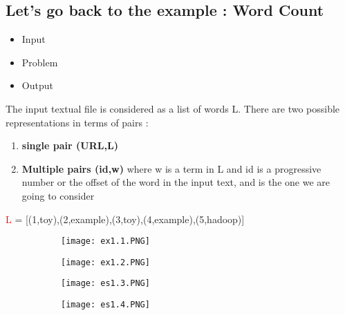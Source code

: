 \documentclass{article}
\begin{document}
\subsection{Let's go back to the example : Word Count}


\begin{itemize}
    \item Input 
    \item Problem 
    \item Output 
\end{itemize}

The input textual file is considered as a list of words L. There are two possible representations in terms of pairs :
\begin{enumerate}
    \item \textbf{single pair (URL,L)}
    \item \textbf{Multiple pairs (id,w)} where w is a term in L and id is a progressive number or the offset of the word in the input text, and is the one we are going to consider
\end{enumerate}

\vspace{3mm}
\textcolor{red}{L} = [(1,toy),(2,example),(3,toy),(4,example),(5,hadoop)]

\begin{figure}[ht!]
  \centering
  \begin{subfigure}[b]{0.5\linewidth}
    \texttt{[image: ex1.1.PNG]}
  \end{subfigure}
     \begin{subfigure}[b]{0.4\textwidth}
         \centering
         \texttt{[image: ex1.2.PNG]}
     \end{subfigure}
\end{figure}

\begin{figure}[ht!]
  \centering
  \begin{subfigure}[b]{0.5\linewidth}
    \texttt{[image: es1.3.PNG]}
  \end{subfigure}
     \begin{subfigure}[b]{0.4\textwidth}
         \centering
         \texttt{[image: es1.4.PNG]}
     \end{subfigure}
\end{figure}
\end{document}
